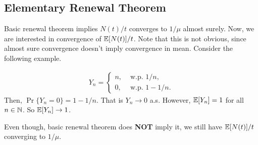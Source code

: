 \documentclass[a4paper,10pt, english]{article}
\begin{document}
\subsection{Elementary Renewal Theorem}
Basic renewal theorem implies $N(t)/t$ converges to $1/\mu$ almost surely. Now, we are interested in convergence of $\mathbb{E}[N(t)]/t$. Note that this is not obvious, since almost sure convergence doesn't imply convergence in mean. Consider the following example.
\begin{exmp}
	\begin{align*}
	Y_n = \begin{cases}
	n, & \mbox{ w.p.  } 1/n,\\
	0, & \mbox{ w.p.  } 1- 1/n.
	\end{cases}
	\end{align*}
	Then, $\Pr\{ Y_n = 0 \} = 1 - 1/n$. %
	That is $Y_n \to 0$ a.s. However, $\mathbb{E}[Y_n] = 1$ for all $n \in \mathbb{N}$. So $\mathbb{E}[Y_n] \to 1$.
\end{exmp}
Even though, basic renewal theorem does \textbf{NOT} imply it, we still have $\mathbb{E}[N(t)]/t$ converging to $1/\mu$.
\end{document}
